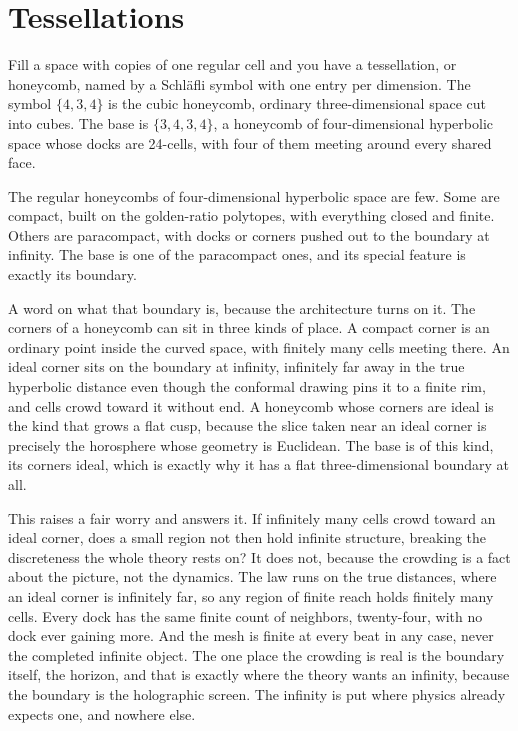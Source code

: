 \section{Tessellations}

Fill a space with copies of one regular cell and you have a tessellation, or honeycomb, named by a Schläfli symbol with one entry per dimension. The symbol $\{4,3,4\}$ is the cubic honeycomb, ordinary three-dimensional space cut into cubes. The base is $\{3,4,3,4\}$, a honeycomb of four-dimensional hyperbolic space whose docks are 24-cells, with four of them meeting around every shared face.

The regular honeycombs of four-dimensional hyperbolic space are few. Some are compact, built on the golden-ratio polytopes, with everything closed and finite. Others are paracompact, with docks or corners pushed out to the boundary at infinity. The base is one of the paracompact ones, and its special feature is exactly its boundary.

A word on what that boundary is, because the architecture turns on it. The corners of a honeycomb can sit in three kinds of place. A compact corner is an ordinary point inside the curved space, with finitely many cells meeting there. An ideal corner sits on the boundary at infinity, infinitely far away in the true hyperbolic distance even though the conformal drawing pins it to a finite rim, and cells crowd toward it without end. A honeycomb whose corners are ideal is the kind that grows a flat cusp, because the slice taken near an ideal corner is precisely the horosphere whose geometry is Euclidean. The base is of this kind, its corners ideal, which is exactly why it has a flat three-dimensional boundary at all.

This raises a fair worry and answers it. If infinitely many cells crowd toward an ideal corner, does a small region not then hold infinite structure, breaking the discreteness the whole theory rests on? It does not, because the crowding is a fact about the picture, not the dynamics. The law runs on the true distances, where an ideal corner is infinitely far, so any region of finite reach holds finitely many cells. Every dock has the same finite count of neighbors, twenty-four, with no dock ever gaining more. And the mesh is finite at every beat in any case, never the completed infinite object. The one place the crowding is real is the boundary itself, the horizon, and that is exactly where the theory wants an infinity, because the boundary is the holographic screen. The infinity is put where physics already expects one, and nowhere else.

